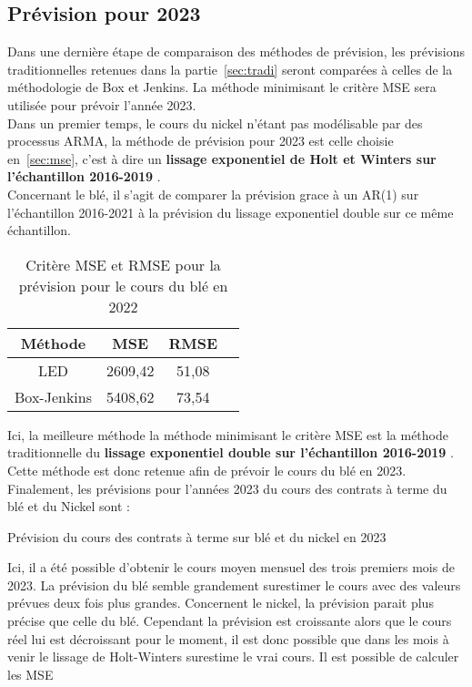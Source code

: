 \subsection{Prévision pour 2023}
Dans une dernière étape de comparaison des méthodes de prévision, les prévisions traditionnelles retenues dans la partie~\ref{sec:tradi} seront comparées à
celles de la méthodologie de Box et Jenkins. La méthode minimisant le critère MSE sera utilisée pour prévoir l'année 2023.\\[11pt]
Dans un premier temps, le cours du nickel n'étant pas modélisable par des processus ARMA, la méthode de prévision pour 2023 est celle choisie en~\ref{sec:mse}, c'est à
dire un \textbf{lissage exponentiel de Holt et Winters sur l'échantillon 2016-2019} . \\[11pt]
Concernant le blé, il s'agit de comparer la prévision grace à un AR(1) sur l'échantillon 2016-2021 à la prévision du lissage exponentiel double sur ce même échantillon.
\begin{table}[H]
    \centering
    \caption{Critère MSE et RMSE pour la prévision pour le cours du blé en 2022}
    \sffamily
    \begin{tabular}{cccc}
        \toprule
        Méthode & MSE   & RMSE \\
        \midrule
        LED &  2609,42 & 51,08  \\
        Box-Jenkins & 5408,62 & 73,54 \\
        \bottomrule
    \end{tabular}%
\end{table}
Ici, la meilleure méthode la méthode minimisant le critère MSE est la méthode traditionnelle du \textbf{lissage exponentiel double sur l'échantillon 2016-2019} . Cette 
méthode est donc retenue afin de prévoir le cours du blé en 2023.\\[11pt]
Finalement, les prévisions pour l'années 2023 du cours des contrats à terme du blé et du Nickel sont :
\begin{table}[H]
    \centering
    \caption{Prévision du cours des contrats à terme sur blé et du nickel en 2023}
    \sffamily
    
\end{table}
Ici, il a été possible d'obtenir le cours moyen mensuel des trois premiers mois de 2023. La prévision du blé semble grandement surestimer le cours avec des valeurs prévues 
deux fois plus grandes. Concernent le nickel, la prévision parait plus précise que celle du blé. Cependant la prévision est croissante alors que le cours réel 
lui est décroissant pour le moment, il est donc possible que dans les mois à venir le lissage de Holt-Winters surestime le vrai cours. Il est possible de calculer les MSE
